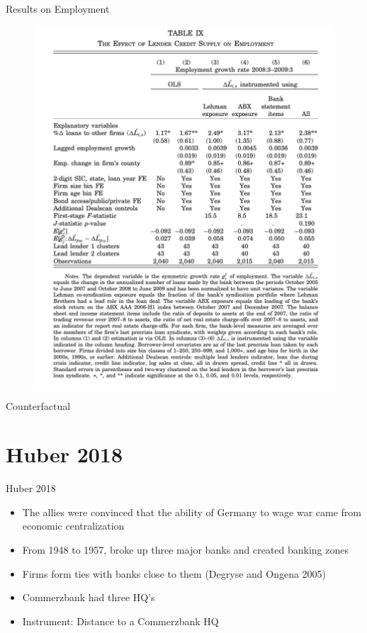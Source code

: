 \documentclass[english,xcolor=svgnames]{beamer}
\begin{document}
\begin{frame}{Results on Employment}
\begin{figure}
\includegraphics[scale=0.45]{figures/cr_4}
\end{figure}
\end{frame}

\begin{frame}{Counterfactual}

\end{frame}

\section{Huber 2018}


\begin{frame}{Huber 2018}
\begin{itemize}
\item The allies were convinced that the ability of Germany to wage war came from economic centralization
\item From 1948 to 1957, broke up three major banks and created banking zones
\item Firms form ties with banks close to them (Degryse and Ongena 2005)
\item Commerzbank had three HQ's
\item Instrument: Distance to a Commerzbank HQ
\end{itemize}
\end{frame}
\end{document}
